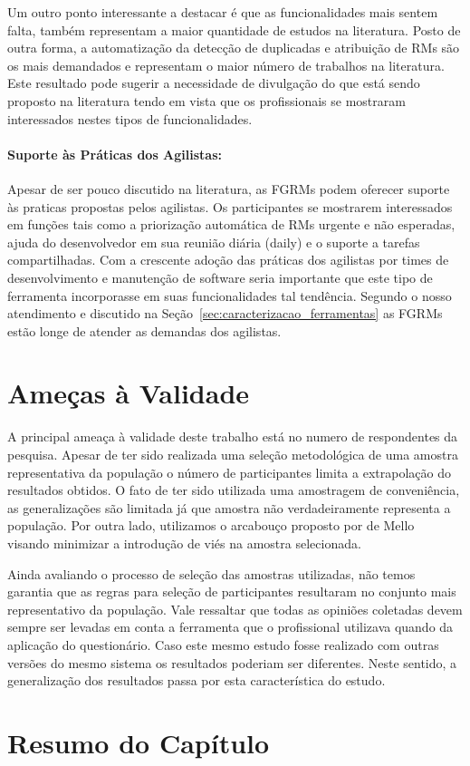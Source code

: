 Um outro ponto interessante a destacar é que as funcionalidades mais sentem
falta, também representam a maior quantidade de estudos na literatura. Posto de
outra forma, a automatização da detecção de duplicadas e atribuição de RMs são
os mais demandados e representam o maior número de trabalhos na literatura. Este
resultado pode sugerir a necessidade de divulgação do que está sendo proposto na
literatura tendo em vista que os profissionais se mostraram interessados nestes
tipos de funcionalidades.

\paragraph{Suporte às Práticas dos Agilistas:}
\label{par:pesq_profissionais_suporte_pratica_agilistas}

Apesar de ser pouco discutido na literatura, as FGRMs podem oferecer suporte às
praticas propostas pelos agilistas. Os participantes se mostrarem interessados
em funções tais como a priorização automática de RMs urgente e não esperadas,
ajuda do desenvolvedor em sua reunião diária (daily) e o suporte a tarefas
compartilhadas. Com a crescente adoção das práticas dos agilistas por times de
desenvolvimento e manutenção de software seria importante que este tipo de
ferramenta incorporasse em suas funcionalidades tal tendência. Segundo o nosso
atendimento e discutido na Seção~\ref{sec:caracterizacao_ferramentas} as FGRMs
estão longe de atender as demandas dos agilistas.

\section{Ameças à Validade}
\label{sec:pesquisa_profissionais_ameacas_validade}

A principal ameaça à validade deste trabalho está no numero de respondentes da
pesquisa. Apesar de ter sido realizada uma seleção metodológica de uma amostra
representativa da população o número de participantes limita a extrapolação do
resultados obtidos. O fato de ter sido utilizada uma amostragem de conveniência,
as generalizações são limitada já que amostra não verdadeiramente representa a
população. Por outra lado, utilizamos o arcabouço proposto por de
Mello~\cite{de2014towards} visando minimizar a introdução de viés na amostra
selecionada.

Ainda avaliando o processo de seleção das amostras utilizadas, não temos
garantia que as regras para seleção de participantes resultaram no conjunto mais
representativo da população. Vale ressaltar que todas as opiniões coletadas
devem sempre ser levadas em conta a ferramenta que o profissional utilizava
quando da aplicação do questionário.  Caso este mesmo estudo fosse realizado com
outras versões do mesmo sistema os resultados poderiam ser diferentes. Neste
sentido, a generalização dos resultados passa por esta característica do estudo.

\section{Resumo do Capítulo}
\label{sec:resumo_do_capitulo}

